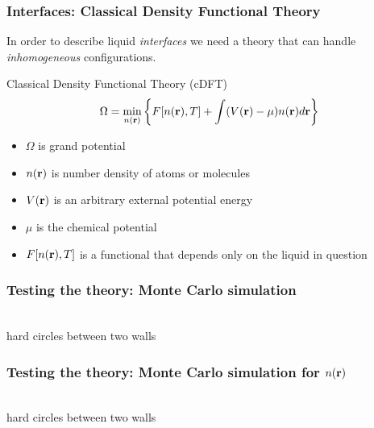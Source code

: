 \begin{frame}
  \frametitle{Interfaces:  Classical Density Functional Theory}
  In order to describe liquid \emph{interfaces} we need a theory that
  can handle \emph{inhomogeneous} configurations.
  \begin{block}{Classical Density Functional Theory (cDFT)}
    \[\Omega = \min_{n(\mathbf{r})} \left\{ F[n(\mathbf{r}), T] + \int (V(\mathbf{r})-\mu) n(\mathbf{r})d\mathbf{r} \right\}
    \]
    \begin{itemize}
    \item $\Omega$ is grand potential
    \item $n(\mathbf{r})$ is number density of atoms or molecules
    \item $V(\mathbf{r})$ is an arbitrary external potential energy
    \item $\mu$ is the chemical potential
    \item $F[n(\mathbf{r}),T]$ is a functional that depends only on the
      liquid in question
    \end{itemize}
  \end{block}
\end{frame}

\begin{frame}
  \frametitle{Testing the theory:  Monte Carlo simulation}
  \vspace{-0.8em}
  \begin{center}
    \\
    \vspace{-0.5em}
    hard circles between two walls
  \end{center}
\end{frame}

\begin{frame}
  \frametitle{Testing the theory:  Monte Carlo simulation for $n(\mathbf{r})$}
  \vspace{-0.8em}
  \begin{center}
    \\
    \vspace{-0.5em}
    hard circles between two walls
  \end{center}
\end{frame}

